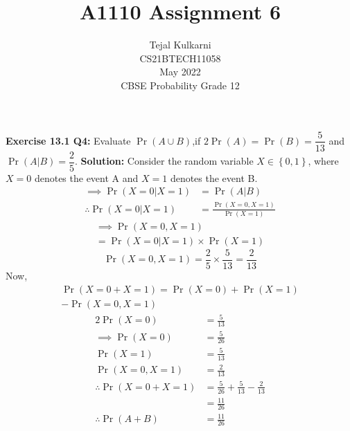 \documentclass[journal,12pt,two column]{IEEEtran}
\title{A1110 Assignment 6 }
\author{Tejal Kulkarni \\ CS21BTECH11058 \\\vspace*{20pt} May 2022 \\ CBSE Probability Grade 12 }
\begin{document}
\newcommand{\solution}{\noindent \textbf{Solution: }}
\providecommand{\pr}[1]{\ensuremath{\Pr\left(#1\right)}}
\providecommand{\qfunc}[1]{\ensuremath{Q\left(#1\right)}}
\providecommand{\sbrak}[1]{\ensuremath{{}\left[#1\right]}}
\providecommand{\lsbrak}[1]{\ensuremath{{}\left[#1\right.}}
\providecommand{\rsbrak}[1]{\ensuremath{{}\left.#1\right]}}
\providecommand{\brak}[1]{\ensuremath{\left(#1\right)}}
\providecommand{\lbrak}[1]{\ensuremath{\left(#1\right.}}
\providecommand{\rbrak}[1]{\ensuremath{\left.#1\right)}}
\providecommand{\cbrak}[1]{\ensuremath{\left\{#1\right\}}}
\providecommand{\lcbrak}[1]{\ensuremath{\left\{#1\right.}}
\providecommand{\rcbrak}[1]{\ensuremath{\left.#1\right\}}}
\newcommand*{\permcomb}[4][0mu]{{{}^{#3}\mkern#1#2_{#4}}}
\newcommand*{\perm}[1][-3mu]{\permcomb[#1]{P}}
\newcommand*{\comb}[1][-1mu]{\permcomb[#1]{C}}
\renewcommand{\thetable}{\arabic{table}} 

\maketitle

\textbf{Exercise 13.1 Q4:} Evaluate $\pr{A \cup B}$,if $2\pr{A} = \pr{B} = \dfrac{5}{13}$ and $\pr{A|B} = \dfrac{2}{5}$. 
\solution
Consider the random variable $X\in \cbrak{0,1}$, where $X = 0$ denotes the event A and $X=1$ denotes the event B. 
\begin{align}
 \implies \pr{X=0|X=1} &= \pr{A|B}  \\ 
 \therefore \pr{X=0|X=1} &= \frac{\pr{X=0,X=1}}{\pr{X=1}} 
\end{align}
\begin{multline}
    \implies \pr{X=0,X=1} \\
          =\pr{X=0|X=1}\times{\pr{X=1}} 
\end{multline}
\begin{equation}
    \pr{X=0, X=1} = \frac{2}{5}\times \frac{5}{13} = \frac{2}{13}
\end{equation}
Now,
\begin{multline}
    \pr{X=0 + X=1} = \pr{X = 0} + \pr{X = 1} \\ - \pr{X=0,X=1} 
\end{multline}
\begin{align}
  2\pr{X = 0} &= \frac{5}{13} \\
  \implies \pr{X = 0} &= \frac{5}{26} \\
  \pr{X = 1} &= \frac{5}{13} \\
  \pr{X=0,X=1} &= \frac{2}{13} \\
  \therefore \pr{X=0 + X=1} &= \frac{5}{26} + \frac{5}{13} - \frac{2}{13}\\
                              &= \frac{11}{26} \\
  \therefore \pr{A + B} &= \boxed{\frac{11}{26}}
\end{align}

    
\end{document}
